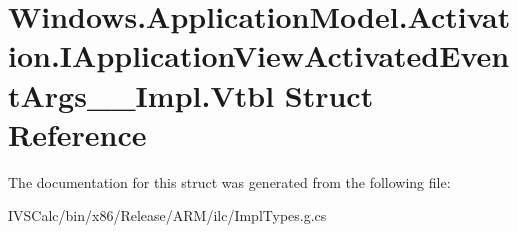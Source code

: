 \hypertarget{struct_windows_1_1_application_model_1_1_activation_1_1_i_application_view_activated_event_args_____impl_1_1_vtbl}{}\section{Windows.\+Application\+Model.\+Activation.\+I\+Application\+View\+Activated\+Event\+Args\+\_\+\+\_\+\+Impl.\+Vtbl Struct Reference}
\label{struct_windows_1_1_application_model_1_1_activation_1_1_i_application_view_activated_event_args_____impl_1_1_vtbl}


The documentation for this struct was generated from the following file\+:\begin{DoxyCompactItemize}
\item 
I\+V\+S\+Calc/bin/x86/\+Release/\+A\+R\+M/ilc/Impl\+Types.\+g.\+cs\end{DoxyCompactItemize}
